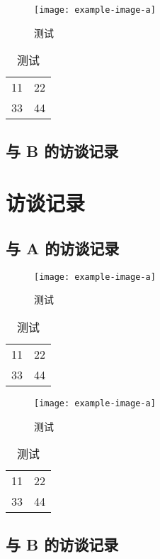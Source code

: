 \begin{figure}[htbp]
  \centering
  \texttt{[image: example-image-a]}
  \caption{测试}
  \label{figure:test3}
\end{figure}

\begin{table}[htbp]
  \centering
  \caption{测试}
  \label{table:test3}
  \begin{tabular}{|c|c|}
    11 & 22 \\
    33 & 44 
  \end{tabular}
\end{table}

\section{与 B 的访谈记录}


\chapter{访谈记录}


\section{与 A 的访谈记录}

\begin{figure}[htbp]
  \centering
  \texttt{[image: example-image-a]}
  \caption{测试}
  \label{figure:test4}
\end{figure}

\begin{table}[htbp]
  \centering
  \caption{测试}
  \label{table:test4}
  \begin{tabular}{|c|c|}
    11 & 22 \\
    33 & 44 
  \end{tabular}
\end{table}

\begin{figure}[htbp]
  \centering
  \texttt{[image: example-image-a]}
  \caption{测试}
  \label{figure:test5}
\end{figure}

\begin{table}[htbp]
  \centering
  \caption{测试}
  \label{table:test5}
  \begin{tabular}{|c|c|}
    11 & 22 \\
    33 & 44 
  \end{tabular}
\end{table}

\section{与 B 的访谈记录}